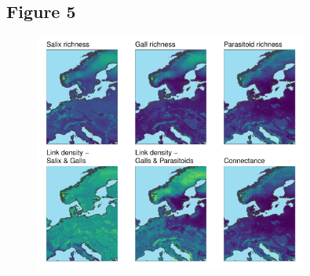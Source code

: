 \documentclass[12pt]{article}
\begin{document}
\newpage




\subsection*{Figure 5}

\begin{figure}[ht!]
\centering\includegraphics[width=0.8\textwidth]{figures/map_connectance}
\end{figure}

\newpage


\end{document}
